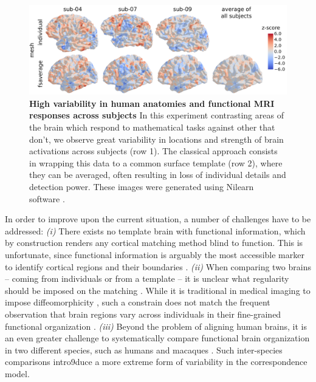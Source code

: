 \begin{figure}[ht]
    \centering
    \includegraphics[width=\columnwidth]{./Chapitre4/figures/intro_variation.pdf}
    \caption{
        \textbf{High variability in human anatomies and functional MRI responses across subjects}
        In this experiment contrasting areas of the brain
        which respond to mathematical tasks against other that
        don't, we observe great variability in locations and strength of brain activations across subjects (row 1).
        The classical approach consists in wrapping this data
        to a common surface template (row 2), where they can be averaged, often resulting in
        loss of individual details and detection power.
        These images were generated using Nilearn software \citep{abraham_machine_2014}.
    }
    \label{fig:intro}
\end{figure}
In order to improve upon the current situation, a number of challenges have to be addressed:
%
\textit{(i)} There exists no template brain with functional information,
which by construction renders any cortical matching method blind to function.
This is unfortunate, since functional information is arguably the most accessible marker
to identify cortical regions and their boundaries \citep{Glasser2016-ha}.
%
\textit{(ii)} When comparing two brains -- coming from individuals or from a template --
it is unclear what regularity should be imposed on the matching \citep{vanessen2012}.
While it is traditional in medical imaging to impose diffeomorphicity \citep{ants},
such a constrain does not match the frequent observation that brain regions vary
across individuals in their fine-grained functional organization \citep{Glasser2016-ha,schneider2019}.
%
\textit{(iii)} Beyond the problem of aligning human brains, it is an even greater challenge
to systematically compare functional brain organization in two different species,
such as humans and macaques \citep{neubert_comparison_2014,mars_whole_2018,xu_cross-species_2020,eichert_cross-species_2020,}.
Such inter-species comparisons intro9duce a more extreme form of variability in the correspondence model.

